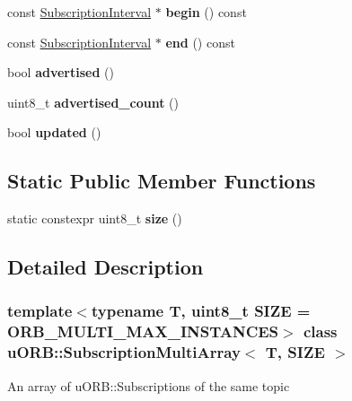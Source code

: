 \begin{DoxyCompactItemize}
const \hyperlink{classuORB_1_1SubscriptionInterval}{Subscription\+Interval} $\ast$ {\bfseries begin} () const
\item 
\mbox{\label{classuORB_1_1SubscriptionMultiArray_a49779c8e56a88f1d375c371060b2c9ba}} 
const \hyperlink{classuORB_1_1SubscriptionInterval}{Subscription\+Interval} $\ast$ {\bfseries end} () const
\item 
\mbox{\label{classuORB_1_1SubscriptionMultiArray_ae0f40d8b769e5e767a0c9ca005beb7ee}} 
bool {\bfseries advertised} ()
\item 
\mbox{\label{classuORB_1_1SubscriptionMultiArray_a189ced9653facfa05f9b561eb9a44c13}} 
uint8\+\_\+t {\bfseries advertised\+\_\+count} ()
\item 
\mbox{\label{classuORB_1_1SubscriptionMultiArray_afe1a493e50fd0004678064fefff336a4}} 
bool {\bfseries updated} ()
\end{DoxyCompactItemize}
\subsection*{Static Public Member Functions}
\begin{DoxyCompactItemize}
\item 
\mbox{\label{classuORB_1_1SubscriptionMultiArray_a4d8b0085665e29c0259192f5d4063fcd}} 
static constexpr uint8\+\_\+t {\bfseries size} ()
\end{DoxyCompactItemize}


\subsection{Detailed Description}
\subsubsection*{template$<$typename T, uint8\+\_\+t S\+I\+ZE = O\+R\+B\+\_\+\+M\+U\+L\+T\+I\+\_\+\+M\+A\+X\+\_\+\+I\+N\+S\+T\+A\+N\+C\+ES$>$\newline
class u\+O\+R\+B\+::\+Subscription\+Multi\+Array$<$ T, S\+I\+Z\+E $>$}

An array of u\+O\+R\+B\+::\+Subscriptions of the same topic 

